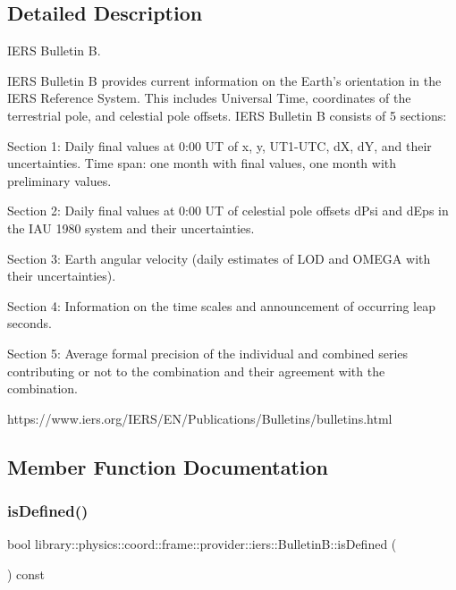 \subsection{Detailed Description}
I\+E\+RS Bulletin B. 

I\+E\+RS Bulletin B provides current information on the Earth’s orientation in the I\+E\+RS Reference System. This includes Universal Time, coordinates of the terrestrial pole, and celestial pole offsets. I\+E\+RS Bulletin B consists of 5 sections\+:

Section 1\+: Daily final values at 0\+:00 UT of x, y, U\+T1-\/\+U\+TC, dX, dY, and their uncertainties. Time span\+: one month with final values, one month with preliminary values.

Section 2\+: Daily final values at 0\+:00 UT of celestial pole offsets d\+Psi and d\+Eps in the I\+AU 1980 system and their uncertainties.

Section 3\+: Earth angular velocity (daily estimates of L\+OD and O\+M\+E\+GA with their uncertainties).

Section 4\+: Information on the time scales and announcement of occurring leap seconds.

Section 5\+: Average formal precision of the individual and combined series contributing or not to the combination and their agreement with the combination.

https\+://www.iers.\+org/\+I\+E\+R\+S/\+E\+N/\+Publications/\+Bulletins/bulletins.html 

\subsection{Member Function Documentation}
\mbox{\label{classlibrary_1_1physics_1_1coord_1_1frame_1_1provider_1_1iers_1_1_bulletin_b_ae385502ba4612cdd801c42ddd7f79bb8}} 
\subsubsection{\texorpdfstring{is\+Defined()}{isDefined()}}
{\footnotesize\ttfamily bool library\+::physics\+::coord\+::frame\+::provider\+::iers\+::\+Bulletin\+B\+::is\+Defined (\begin{DoxyParamCaption}{ }\end{DoxyParamCaption}) const}

